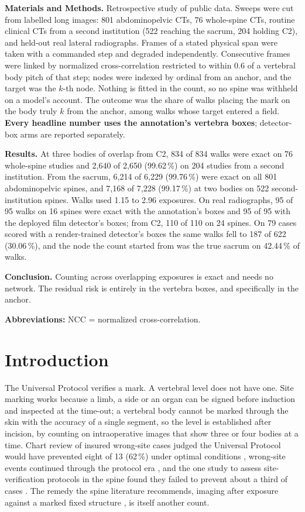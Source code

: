 \documentclass[11pt,letterpaper]{article}
\newcommand{\pc}[1]{#1\,\%}
\begin{document}
\noindent\textbf{Materials and Methods.} Retrospective study of public data. Sweeps were cut from labelled
long images: 801 abdominopelvic CTs, 76 whole-spine CTs, routine clinical CTs from a second institution
(522 reaching the sacrum, 204 holding C2), and held-out real lateral radiographs. Frames of a stated physical span were taken with a
commanded step and degraded independently. Consecutive frames were linked by normalized cross-correlation
restricted to within 0.6 of a vertebral body pitch of that step; nodes were indexed by ordinal from an
anchor, and the target was the $k$-th node. Nothing is fitted in the count, so no spine was withheld on a
model's account. The outcome was the share of walks placing the mark on the body truly $k$ from the anchor,
among walks whose target entered a field. \textbf{Every headline number uses the annotation's vertebra
boxes}; detector-box arms are reported separately.

\noindent\textbf{Results.} At three bodies of overlap from C2, 834 of 834 walks were exact on 76
whole-spine studies and 2,640 of 2,650 (\pc{99.62}) on 204 studies from a second institution. From the
sacrum, 6,214 of 6,229 (\pc{99.76}) were exact on all 801 abdominopelvic spines, and 7,168 of 7,228
(\pc{99.17}) at two bodies on 522 second-institution spines. Walks used 1.15 to 2.96 exposures. On real
radiographs, 95 of 95 walks on 16 spines were exact with the annotation's boxes and 95 of 95 with the
deployed film detector's boxes; from C2, 110 of 110 on 24 spines. On 79 cases scored with a render-trained
detector's boxes the same walks fell to 187 of 622 (\pc{30.06}), and the node the count started from was
the true sacrum on \pc{42.44} of walks.

\noindent\textbf{Conclusion.} Counting across overlapping exposures is exact and needs no network. The
residual risk is entirely in the vertebra boxes, and specifically in the anchor.

\medskip
\noindent\textbf{Abbreviations:} NCC = normalized cross-correlation.

\section*{Introduction}

The Universal Protocol verifies a mark. A vertebral level does not have one. Site marking works because a
limb, a side or an organ can be signed before induction and inspected at the time-out; a vertebral body
cannot be marked through the skin with the accuracy of a single segment, so the level is established after
incision, by counting on intraoperative images that show three or four bodies at a time. Chart review of
insured wrong-site cases judged the Universal Protocol would have prevented eight of 13 (\pc{62}) under
optimal conditions \citep{kwaan2006}, wrong-site events continued through the protocol era
\citep{stahel2010}, and the one study to assess site-verification protocols in the spine found they failed
to prevent about a third of cases \citep{longo2012}. The remedy the spine literature recommends, imaging
after exposure against a marked fixed structure \citep{devine2010}, is itself another count.
\end{document}
